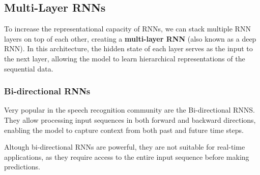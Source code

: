 \subsection{Multi-Layer RNNs}
To increase the representational capacity of RNNs, we can stack multiple RNN layers on top of each other, creating a \textbf{multi-layer RNN} (also known as a deep RNN).
In this architecture, the hidden state of each layer serves as the input to the next layer, allowing the model to learn hierarchical representations of the sequential data.

\subsubsection{Bi-directional RNNs}
Very popular in the speech recognition community are the Bi-directional RNNS. They allow processing input sequences in both
forward and backward directions, enabling the model to capture context from both past and future time steps.

Altough bi-directional RNNs are powerful, they are not suitable for real-time applications, as they require access to the entire input sequence before making predictions.
